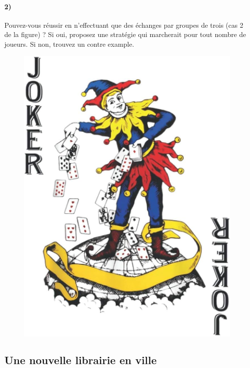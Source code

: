 \documentclass[a4paper,10pt,oneside]{article}
\begin{document}
\paragraph*{2)} 
Pouvez-vous réussir en n'effectuant que des échanges par groupes de trois (cas 2 de la figure) ?
Si oui, proposez une stratégie qui marcherait pour tout nombre de joueurs.
Si non, trouvez un contre example.

\vspace{3cm}
\begin{figure}[!ht]
  \centering
  \includegraphics[height=0.5\textheight]{figures/traders.jpg}
  \caption*{}
\end{figure}


\newpage
\subsection{Une nouvelle librairie en ville}
\end{document}

